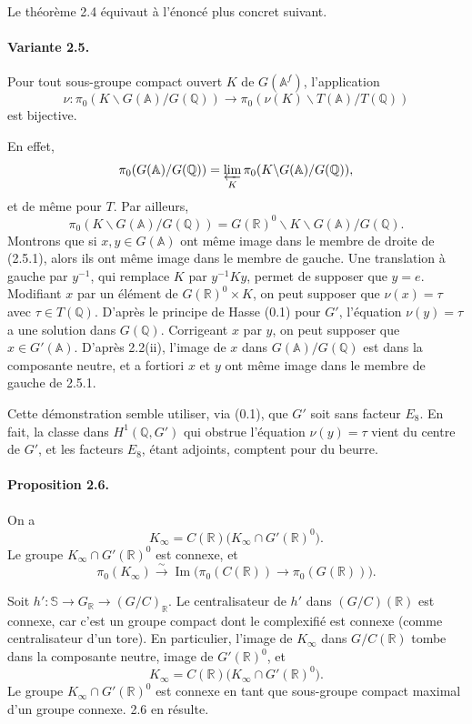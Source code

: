 \documentclass[10pt]{article}
\newcommand{\A}{\mathbb A}
\newcommand{\Af}{\mathbb A^f}
\newcommand{\Q}{\mathbb Q}
\newcommand{\R}{\mathbb R}
\newcommand{\bS}{\mathbb S}
\newcommand{\limproj}{\varprojlim}
\begin{document}
Le théorème 2.4 équivaut à l'énoncé plus concret suivant.

\paragraph{Variante 2.5.} Pour tout sous-groupe compact ouvert $K$ de $G(\Af)$, l'application
\[
\nu:\pi_0(K\backslash G(\A)/G(\Q))\longrightarrow\pi_0(\nu(K)\backslash T(\A)/T(\Q)) \tag{2.5.1}
\]
est bijective.

En effet,
\[
\pi_0(G(\A)/G(\Q))=\limproj_K\pi_0(K\backslash G(\A)/G(\Q)),
\]
et de même pour $T$. Par ailleurs,
\[
\pi_0(K\backslash G(\A)/G(\Q))=G(\R)^0\backslash K\backslash G(\A)/G(\Q).
\]
Montrons que si $x,y\in G(\A)$ ont même image dans le membre de droite de (2.5.1), alors ils ont même image dans le membre de gauche. Une translation à gauche par $y^{-1}$, qui remplace $K$ par $y^{-1}Ky$, permet de supposer que $y=e$. Modifiant $x$ par un élément de $G(\R)^0\times K$, on peut supposer que $\nu(x)=\tau$ avec $\tau\in T(\Q)$. D'après le principe de Hasse (0.1) pour $G'$, l'équation $\nu(y)=\tau$ a une solution dans $G(\Q)$. Corrigeant $x$ par $y$, on peut supposer que $x\in G'(\A)$. D'après 2.2(ii), l'image de $x$ dans $G(\A)/G(\Q)$ est dans la composante neutre, et a fortiori $x$ et $y$ ont même image dans le membre de gauche de 2.5.1.

Cette démonstration semble utiliser, via (0.1), que $G'$ soit sans facteur $E_8$. En fait, la classe dans $H^1(\Q,G')$ qui obstrue l'équation $\nu(y)=\tau$ vient du centre de $G'$, et les facteurs $E_8$, étant adjoints, comptent pour du beurre.

\paragraph{Proposition 2.6.} On a
\[
K_\infty=C(\R)\bigl(K_\infty\cap G'(\R)^0\bigr).
\]
Le groupe $K_\infty\cap G'(\R)^0$ est connexe, et
\[
\pi_0(K_\infty)\xrightarrow{\sim}\operatorname{Im}\bigl(\pi_0(C(\R))\longrightarrow\pi_0(G(\R))\bigr).
\]

Soit $h':\bS\to G_\R\to(G/C)_\R$. Le centralisateur de $h'$ dans $(G/C)(\R)$ est connexe, car c'est un groupe compact dont le complexifié est connexe (comme centralisateur d'un tore). En particulier, l'image de $K_\infty$ dans $G/C(\R)$ tombe dans la composante neutre, image de $G'(\R)^0$, et
\[
K_\infty=C(\R)\bigl(K_\infty\cap G'(\R)^0\bigr).
\]
Le groupe $K_\infty\cap G'(\R)^0$ est connexe en tant que sous-groupe compact maximal d'un groupe connexe. 2.6 en résulte.
\end{document}
